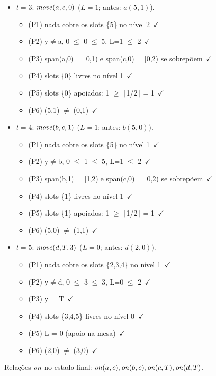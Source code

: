 \begin{itemize}
\begin{itemize}
\end{itemize}
\item $t=3$: $\mathit{move}(a,c,0)$ ($L=1$; antes: $a(5,1)$).
\begin{itemize}
\item (P1) nada cobre os slots \{5\} no nível 2\ $\checkmark$
\item (P2) y$\neq$a, 0 $\le$ 0 $\le$ 5, L=1 $\le$ 2\ $\checkmark$
\item (P3) span(a,0) = [0,1) e span(c,0) = [0,2) se sobrepõem\ $\checkmark$
\item (P4) slots \{0\} livres no nível 1\ $\checkmark$
\item (P5) slots \{0\} apoiados: 1 $\ge$ $\lceil$1/2$\rceil$ = 1\ $\checkmark$
\item (P6) (5,1) $\neq$ (0,1)\ $\checkmark$
\end{itemize}
\item $t=4$: $\mathit{move}(b,c,1)$ ($L=1$; antes: $b(5,0)$).
\begin{itemize}
\item (P1) nada cobre os slots \{5\} no nível 1\ $\checkmark$
\item (P2) y$\neq$b, 0 $\le$ 1 $\le$ 5, L=1 $\le$ 2\ $\checkmark$
\item (P3) span(b,1) = [1,2) e span(c,0) = [0,2) se sobrepõem\ $\checkmark$
\item (P4) slots \{1\} livres no nível 1\ $\checkmark$
\item (P5) slots \{1\} apoiados: 1 $\ge$ $\lceil$1/2$\rceil$ = 1\ $\checkmark$
\item (P6) (5,0) $\neq$ (1,1)\ $\checkmark$
\end{itemize}
\item $t=5$: $\mathit{move}(d,T,3)$ ($L=0$; antes: $d(2,0)$).
\begin{itemize}
\item (P1) nada cobre os slots \{2,3,4\} no nível 1\ $\checkmark$
\item (P2) y$\neq$d, 0 $\le$ 3 $\le$ 3, L=0 $\le$ 2\ $\checkmark$
\item (P3) y = T\ $\checkmark$
\item (P4) slots \{3,4,5\} livres no nível 0\ $\checkmark$
\item (P5) L = 0 (apoio na mesa)\ $\checkmark$
\item (P6) (2,0) $\neq$ (3,0)\ $\checkmark$
\end{itemize}
\end{itemize}
Relações $\mathit{on}$ no estado final: $\mathit{on}(a,c), \mathit{on}(b,c), \mathit{on}(c,T), \mathit{on}(d,T)$.
